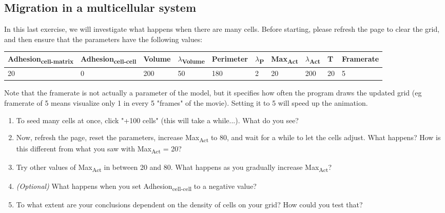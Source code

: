 \documentclass{article}
\begin{document}
\subsection*{Migration in a multicellular system}

In this last exercise, we will investigate what happens when there are many cells. Before starting, please refresh the page to clear the grid, and then ensure that the parameters have the following values:

\begin{center}
\setlength{\tabcolsep}{3pt}
\small
	\begin{tabular}{l l l l l l l l l l }
		Adhesion\textsubscript{cell-matrix} & Adhesion\textsubscript{cell-cell} &
			Volume & $\lambda$\textsubscript{Volume} & 
			Perimeter & $\lambda$\textsubscript{P} &
			Max\textsubscript{Act} & $\lambda$\textsubscript{Act} &
			T & Framerate \\ \hline
		20 & 0 & 200 & 50 & 180 & 2 & 20 & 200 & 20 & 5 \\
	\end{tabular}

\end{center}

Note that the framerate is not actually a parameter of the model, but it specifies how often the program draws the updated grid (eg framerate of 5 means visualize only 1 in every 5 "frames" of the movie). Setting it to 5 will speed up the animation.

\begin{enumerate}
	\item To seed many cells at once, click "+100 cells" (this will take a while...). What do you see?
	\item Now, refresh the page, reset the parameters, increase Max\textsubscript{Act} to 80, and wait for a while to let the cells adjust. What happens? How is this different from what you saw with Max\textsubscript{Act} = 20?
	\item Try other values of Max\textsubscript{Act} in between 20 and 80. What happens as you gradually increase Max\textsubscript{Act}?
	\item \textit{(Optional)} What happens when you set Adhesion\textsubscript{cell-cell} to a negative value?
	\item To what extent are your conclusions dependent on the density of cells on your grid? How could you test that?
\end{enumerate}





\end{document}
